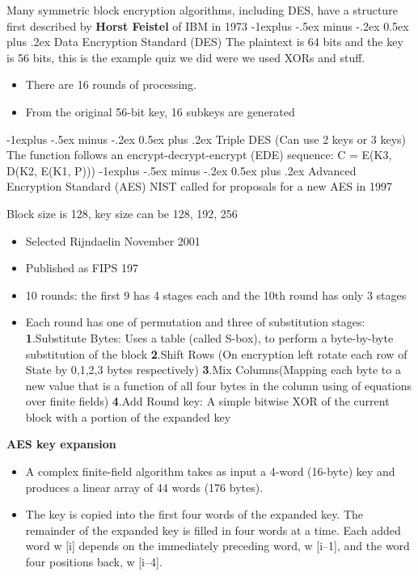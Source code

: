 \documentclass[10pt,landscape]{article}
\makeatletter
\renewcommand{\subsection}{\@startsection{subsection}{2}{0mm}%
    {-1explus -.5ex minus -.2ex}%
    {0.5ex plus .2ex}%
    {\normalfont\normalsize\bfseries}}
\makeatother
\begin{document}
\begin{multicols}{3}
Many symmetric block encryption algorithms, including DES, have a structure first described by
\textbf{Horst Feistel} of IBM in 1973
\subsection{Data Encryption Standard (DES)}
The plaintext is 64 bits and the key is 56 bits, this is the example quiz we did were we used XORs
and stuff.
\begin{itemize}
\item There are 16 rounds of processing.
\item From the original 56-bit key, 16 subkeys are generated
\end{itemize}
\subsection{Triple DES (Can use 2 keys or 3 keys)}
The function follows an encrypt-decrypt-encrypt (EDE) sequence: C = E(K3, D(K2, E(K1, P)))
\subsection{Advanced Encryption Standard (AES)}
NIST called for proposals for a new AES in 1997

Block size is 128, key size can be 128, 192, 256
\begin{itemize}
\item Selected Rijndaelin November 2001
\item Published as FIPS 197
\item 10 rounds: the first 9 has 4 stages each and the 10th round has only 3 stages
\item Each round has one of permutation and three of substitution stages: \textbf{1}.Substitute
  Bytes: Uses a table (called S-box), to perform a byte-by-byte substitution of the block
  \textbf{2}.Shift Rows (On encryption left rotate each row of State by 0,1,2,3 bytes respectively)
  \textbf{3}.Mix Columns(Mapping each byte to a new value that is a function of all four bytes in
  the column using of equations over finite fields) \textbf{4}.Add Round key: A simple bitwise XOR
  of the current block with a portion of the expanded key
\end{itemize}

\textbf{AES key expansion}
\begin{itemize}
\item A complex finite-field algorithm takes as input a 4-word (16-byte) key and produces a linear array of 44 words (176 bytes). 
\item The key is copied into the first four words of the expanded key. The remainder of the expanded
  key is filled in four words at a time. Each added word w [i] depends on the immediately preceding
  word, w [i–1], and the word four positions back, w [i–4].
\end{itemize}


\end{multicols}
\end{document}
